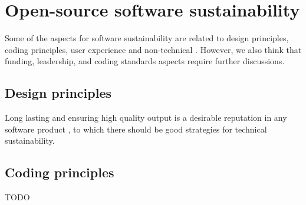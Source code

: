 \documentclass{article}
\begin{document}
\section{Open-source software sustainability}
Some of the aspects for software sustainability are related to design principles, coding principles, user experience and non-technical \cite{imran2019software}. However, we also think that funding, leadership, and coding standards aspects require further discussions.

\subsection{Design principles}
Long lasting and ensuring high quality output is a desirable reputation in any software product \cite{imran2019software}, to which there should be good strategies for technical sustainability.





\subsection{Coding principles}
TODO
\end{document}
